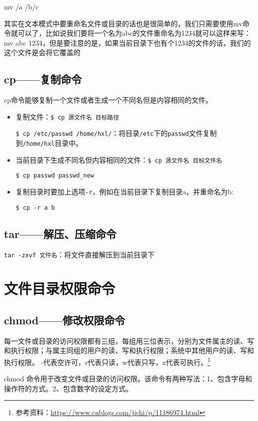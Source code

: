 mv /a /b/c

其实在文本模式中要重命名文件或目录的话也是很简单的，我们只需要使用mv命令就可以了，比如说我们要将一个名为abc的文件重命名为1234就可以这样来写：mv abc 1234，但是要注意的是，如果当前目录下也有个1234的文件的话，我们的这个文件是会将它覆盖的


\subsection{cp——复制命令}
cp命令能够复制一个文件或者生成一个不同名但是内容相同的文件。
\begin{itemize}
\item 复制文件：\verb*|$ cp 源文件名 目标路径|

\verb*|$ cp /etc/passwd /home/hxl/|：将目录\verb|/etc|下的\verb|passwd|文件复制到\verb|/home/hxl|目录中。

\item 当前目录下生成不同名但内容相同的文件：\verb*|$ cp 源文件名 目标文件名|

\verb*|$ cp passwd passwd_new|

\item 复制目录时要加上选项\verb*|-r|，例如在当前目录下复制目录a，并重命名为b:

\verb*|$ cp -r a b|
\end{itemize}




\subsection{tar——解压、压缩命令}
\verb|tar -zxvf 文件名|：将文件直接解压到当前目录下



\section{文件目录权限命令}
\subsection{chmod——修改权限命令}
每一文件或目录的访问权限都有三组，每组用三位表示，分别为文件属主的读、写和执行权限；与属主同组的用户的读、写和执行权限；系统中其他用户的读、写和执行权限。
-代表空许可，r代表只读，w代表只写，x代表可执行。\footnote{参考资料：\url{https://www.cnblogs.com/jichi/p/11186974.html} }

chmod 命令用于改变文件或目录的访问权限。该命令有两种写法：1、包含字母和操作符的方式。2、包含数字的设定方式。

